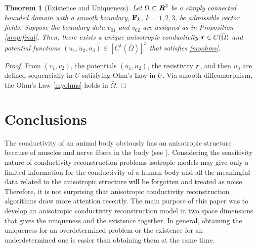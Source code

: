 \documentclass[11pt]{amsart}
\theoremstyle{plain}
\newtheorem{Thm}{Theorem}
\theoremstyle{remark}
\numberwithin{equation}{section}
\numberwithin{Thm}{section}
\def\R{\mbox{\boldmath$R$}}
\def\F{{\bf F}}
\def\r{{\bf r}}
\def\r{\mbox{\boldmath$r$}}
\begin{document}
\begin{Thm}[Existence and Uniqueness] \label{thm:main} Let $\Omega\subset\R^2$ be a simply connected bounded domain with a smooth boundary, $\F_k$, $k=1,2,3$, be admissible vector fields. Suppose the boundary data $v_{01}$ and $v_{02}$ are assigned as in Proposition \ref{prop:final}. Then, there exists a unique anisotropic conductivity $\r\in C(\overline\Omega)$ and potential functions $(u_1,u_2,u_3) \in [C^1(\overline\Omega)]^3$ that satisfies \eqref{myohms}.
\end{Thm}
\begin{proof}
 From $(v_1,v_2)$, the potentials $(u_1,u_2)$, the resistivity $\r$, and then $u_3$ are defined sequencially in $\overline U$ satisfying Ohm's Law in $\overline U$. Via smooth diffeomorphism, the Ohm's Law \eqref{myohms} holds in $\overline \Omega$.
\end{proof}


\section{Conclusions}\label{sect.con}

The conductivity of an animal body obviously has an anisotropic structure because of muscles and nerve fibers in the body (see \cite{Nicholson1965386,Roth2000}). Considering the sensitivity nature of conductivity reconstruction problems isotropic models may give only a limited information for the conductivity of a human body and all the meaningful data related to the anisotropic structure will be forgotten and treated as noise. Therefore, it is not surprising that anisotropic conductivity reconstruction algorithms draw more attention recently. The main purpose of this paper was to develop an anisotropic conductivity reconstruction model in two space dimensions that gives the uniqueness and the existence together. In general, obtaining the uniqueness for an overdetermined problem or the existence for an underdetermined one is easier than obtaining them at the same time. 
\end{document}
